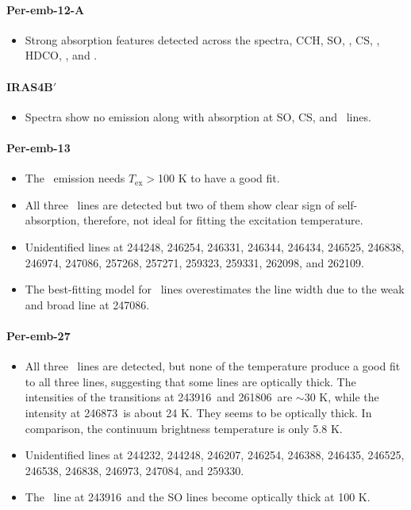 \paragraph{Per-emb-12-A}
\begin{itemize}
  \item Strong absorption features detected across the spectra, CCH, SO, \htcn, CS, \methanol, HDCO, \methylcyanide, and \methylformate.
\end{itemize}

\paragraph{IRAS4B$\prime$}
\begin{itemize}
  \item Spectra show no emission along with absorption at SO, CS, and \methanol\ lines.
\end{itemize}

\paragraph{Per-emb-13}
\begin{itemize}
  \item The \methylformate\ emission needs $T_\text{ex} > $100 K to have a good fit.
  \item All three \methanol\ lines are detected but two of them show clear sign of self-absorption, therefore, not ideal for fitting the excitation temperature.
  \item Unidentified lines at 244248\mhz, 246254\mhz, 246331\mhz, 246344\mhz, 246434\mhz, 246525\mhz, 246838\mhz, 246974\mhz, 247086\mhz, 257268\mhz, 257271\mhz, 259323\mhz, 259331\mhz, 262098\mhz, and 262109\mhz.
  \item The best-fitting model for \tmethanol\ lines overestimates the line width due to the weak and broad line at 247086\mhz.
\end{itemize}

\paragraph{Per-emb-27}
\begin{itemize}
  \item All three \methanol\ lines are detected, but none of the temperature produce a good fit to all three lines, suggesting that some lines are optically thick.  The intensities of the transitions at 243916\mhz\ and 261806\mhz\ are $\sim$30 K, while the intensity at 246873\mhz\ is about 24 K.  They seems to be optically thick.  In comparison, the continuum brightness temperature is only 5.8 K.
  \item Unidentified lines at 244232\mhz, 244248\mhz, 246207\mhz, 246254\mhz, 246388\mhz, 246435\mhz, 246525\mhz, 246538\mhz, 246838\mhz, 246973\mhz, 247084\mhz, and 259330\mhz.
  \item The \methanol\ line at 243916\mhz\ and the SO lines become optically thick at 100 K.
\end{itemize}

